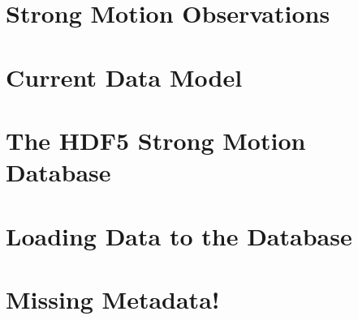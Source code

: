 \section{Strong Motion Observations}
\label{sec:data_model}

\section{Current Data Model}

\section{The HDF5 Strong Motion Database}
\label{sec:hdf5}

\section{Loading Data to the Database}
\label{sec:loading}

\section{Missing Metadata!}
\label{sec:missing_metadata}

